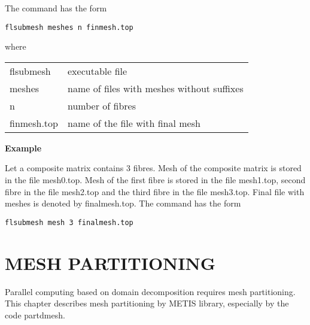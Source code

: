 \documentclass[12pt]{book}
\begin{document}
\vspace{2mm}
\noindent
The command has the form

{\tt flsubmesh meshes n finmesh.top}

\vspace{2mm}
\noindent
where

\vspace{2mm}
\noindent
\begin{center}
\begin{tabular}{ll}
flsubmesh & executable file
\\
meshes & name of files with meshes without suffixes
\\
n & number of fibres
\\
finmesh.top & name of the file with final mesh
\\
\end{tabular}
\end{center}


\vspace{3mm}
\noindent
{\bf Example}

\noindent
Let a composite matrix contains 3 fibres. Mesh of the composite matrix is stored
in the file mesh0.top. Mesh of the first fibre is stored in the file mesh1.top,
second fibre in the file mesh2.top and the third fibre in the file mesh3.top.
Final file with meshes is denoted by finalmesh.top. The command has the form


{\tt flsubmesh mesh 3 finalmesh.top}



\chapter{MESH PARTITIONING}

Parallel computing based on domain decomposition requires mesh partitioning. This
chapter describes mesh partitioning by METIS library, especially by the code partdmesh.

\end{document}
